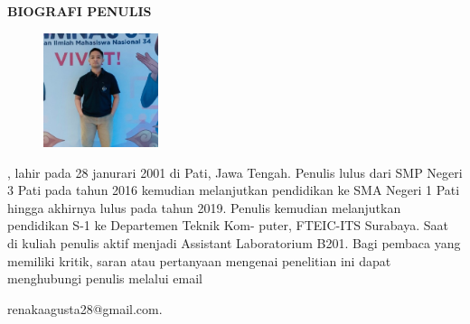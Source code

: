 \begin{center}
  \Large
  \textbf{BIOGRAFI PENULIS}
\end{center}


\vspace{2ex}

\begin{figure}
  \centering
  \vspace{-3ex}
  \includegraphics[width=0.3\textwidth]{gambar/img-writer.jpg}
  \vspace{-4ex}
\end{figure}

\name{}, lahir pada 28 janurari 2001 di
Pati, Jawa Tengah. Penulis lulus dari SMP Negeri 3 Pati pada tahun 2016 kemudian melanjutkan pendidikan ke SMA Negeri 1 Pati hingga akhirnya lulus pada tahun 2019. Penulis kemudian melanjutkan pendidikan S-1 ke Departemen Teknik Kom-
puter, FTEIC-ITS Surabaya. Saat di kuliah penulis aktif menjadi Assistant Laboratorium
B201. Bagi pembaca yang memiliki kritik, saran atau pertanyaan mengenai penelitian ini dapat menghubungi penulis melalui email

renakaagusta28@gmail.com.
